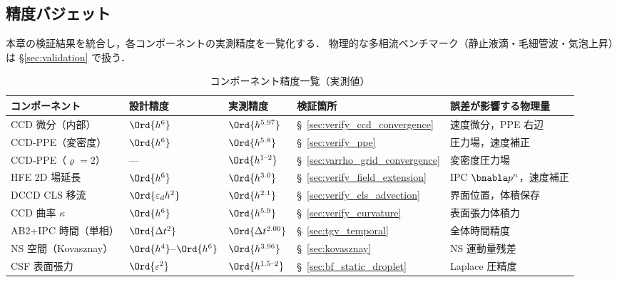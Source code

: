 %

\subsection{精度バジェット}
\label{sec:error_budget}

本章の検証結果を統合し，各コンポーネントの実測精度を一覧化する．
物理的な多相流ベンチマーク（静止液滴・毛細管波・気泡上昇）は §\ref{sec:validation} で扱う．

\begin{table}[htbp]
\centering
\caption{コンポーネント精度一覧（実測値）}
\label{tab:error_budget}
\renewcommand{\arraystretch}{1.35}
\begin{tabular}{>{\raggedright\arraybackslash}p{32mm}>{\raggedright\arraybackslash}p{22mm}>{\raggedright\arraybackslash}p{22mm}>{\raggedright\arraybackslash}p{16mm}>{\raggedright\arraybackslash}p{38mm}}
\toprule
コンポーネント & 設計精度 & 実測精度 & 検証箇所 & 誤差が影響する物理量 \\
\midrule
CCD 微分（内部） & $\Ord{h^6}$ & $\Ord{h^{5.97}}$ & §~\ref{sec:verify_ccd_convergence} & 速度微分，PPE 右辺 \\
CCD-PPE（変密度） & $\Ord{h^6}$ & $\Ord{h^{5.8}}$ & §~\ref{sec:verify_ppe} & 圧力場，速度補正 \\
CCD-PPE（$\varrho{=}2$） & --- & $\Ord{h^{1\text{--}2}}$ & §~\ref{sec:varrho_grid_convergence} & 変密度圧力場 \\
HFE 2D 場延長 & $\Ord{h^6}$ & $\Ord{h^{3.0}}$ & §~\ref{sec:verify_field_extension} & IPC $\bnabla p^n$，速度補正 \\
DCCD CLS 移流 & $\Ord{\varepsilon_d h^2}$ & $\Ord{h^{2.1}}$ & §~\ref{sec:verify_cls_advection} & 界面位置，体積保存 \\
CCD 曲率 $\kappa$ & $\Ord{h^6}$ & $\Ord{h^{5.9}}$ & §~\ref{sec:verify_curvature} & 表面張力体積力 \\
AB2+IPC 時間（単相） & $\Ord{\Delta t^2}$ & $\Ord{\Delta t^{2.00}}$ & §~\ref{sec:tgv_temporal} & 全体時間精度 \\
NS 空間（Kovasznay） & $\Ord{h^4}$--$\Ord{h^6}$ & $\Ord{h^{3.96}}$ & §~\ref{sec:kovasznay} & NS 運動量残差 \\
CSF 表面張力 & $\Ord{\varepsilon^2}$ & $\Ord{h^{1.5\text{--}2}}$ & §~\ref{sec:bf_static_droplet} & Laplace 圧精度 \\
\bottomrule
\end{tabular}
\end{table}

